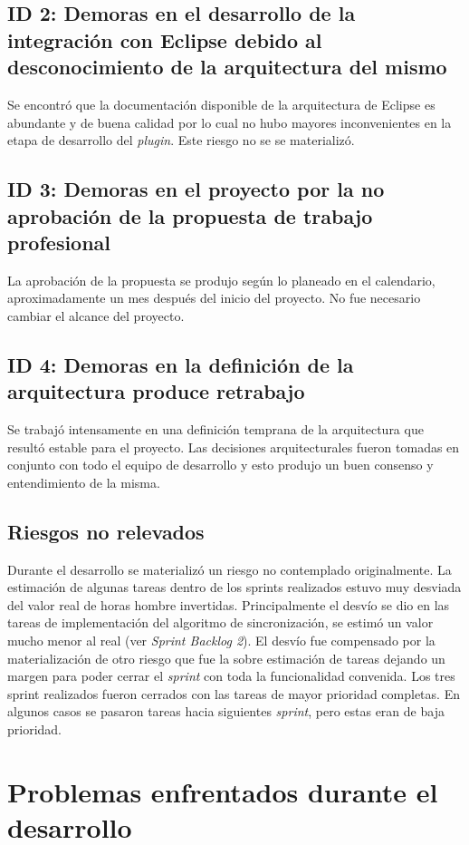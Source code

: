 \documentclass[12pt,a4paper]{article}
\let\stdsection\section
\renewcommand\section{\newpage\stdsection}
\begin{document}
\subsection{ID 2: Demoras en el desarrollo de la integración con Eclipse debido al desconocimiento de la 
arquitectura del mismo}
Se encontró que la documentación disponible de la arquitectura de Eclipse es abundante y de buena calidad por
lo cual no hubo mayores inconvenientes en la etapa de desarrollo del \textit{plugin}. Este riesgo no se se
materializó.

\subsection{ID 3: Demoras en el proyecto por la no aprobación de la propuesta de trabajo profesional}
La aprobación de la propuesta se produjo según lo planeado en el calendario, aproximadamente un mes después del
inicio del proyecto. No fue necesario cambiar el alcance del proyecto.

\subsection{ID 4: Demoras en la definición de la arquitectura produce retrabajo}
Se trabajó intensamente en una definición temprana de la arquitectura que resultó estable para el proyecto. Las
decisiones arquitecturales fueron tomadas en conjunto con todo el equipo de desarrollo y esto produjo un buen
consenso y entendimiento de la misma.

\subsection{Riesgos no relevados}
Durante el desarrollo se materializó un riesgo no contemplado originalmente. La estimación de algunas tareas dentro
de los sprints \cite{sprint} realizados estuvo muy desviada del valor real de horas hombre invertidas. Principalmente el desvío se
dio en las tareas de implementación del algoritmo de sincronización, se estimó un valor mucho menor al real (ver
\textit{Sprint Backlog 2}). El desvío fue compensado por la materialización de otro riesgo que fue la sobre estimación
de tareas dejando un margen para poder cerrar el \textit{sprint} con toda la funcionalidad convenida.
Los tres sprint realizados fueron cerrados con las tareas de mayor prioridad completas. En algunos casos se pasaron 
tareas hacia siguientes \textit{sprint}, pero estas eran de baja prioridad.

\section{Problemas enfrentados durante el desarrollo}
\end{document}
